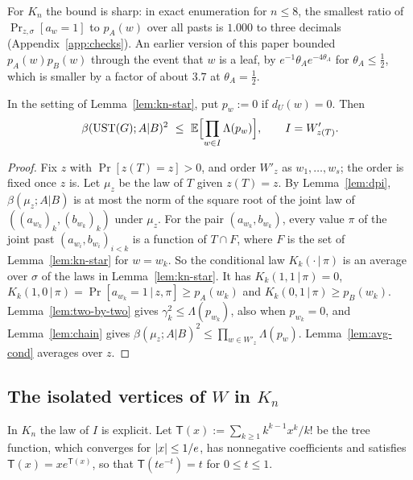 For $K_n$ the bound is sharp: in exact enumeration for $n\le8$, the smallest ratio of $\Pr_{z,\sigma}[a_w=1]$ to $p_A(w)$ over all pasts is $1.000$ to three decimals (Appendix~\ref{app:checks}). An earlier version of this paper bounded $p_A(w)p_B(w)$ through the event that $w$ is a leaf, by $e^{-1}\theta_Ae^{-4\theta_A}$ for $\theta_A\le\frac12$, which is smaller by a factor of about $3.7$ at $\theta_A=\frac12$.

\begin{lemma}\label{lem:kn-master}
In the setting of Lemma~\ref{lem:kn-star}, put $p_w:=0$ if $d_U(w)=0$. Then
\[
  \beta(\UST(G);A|B)^2\ \le\ \E\Bigl[\prod_{w\in I}\Lambda(p_w)\Bigr],\qquad I=W'_{z(T)} .
\]
\end{lemma}

\begin{proof}
Fix $z$ with $\Pr[z(T)=z]>0$, and order $W'_z$ as $w_1,\dots,w_s$; the order is fixed once $z$ is. Let $\mu_z$ be the law of $T$ given $z(T)=z$. By Lemma~\ref{lem:dpi}, $\beta(\mu_z;A|B)$ is at most the norm of the square root of the joint law of $((a_{w_k})_k,(b_{w_k})_k)$ under $\mu_z$. For the pair $(a_{w_k},b_{w_k})$, every value $\pi$ of the joint past $(a_{w_i},b_{w_i})_{i<k}$ is a function of $T\cap F$, where $F$ is the set of Lemma~\ref{lem:kn-star} for $w=w_k$. So the conditional law $K_k(\cdot\,|\,\pi)$ is an average over $\sigma$ of the laws in Lemma~\ref{lem:kn-star}. It has $K_k(1,1\,|\,\pi)=0$, $K_k(1,0\,|\,\pi)=\Pr[a_{w_k}=1\,|\,z,\pi]\ge p_A(w_k)$ and $K_k(0,1\,|\,\pi)\ge p_B(w_k)$. Lemma~\ref{lem:two-by-two} gives $\gamma_k^2\le\Lambda(p_{w_k})$, also when $p_{w_k}=0$, and Lemma~\ref{lem:chain} gives $\beta(\mu_z;A|B)^2\le\prod_{w\in W'_z}\Lambda(p_w)$. Lemma~\ref{lem:avg-cond} averages over $z$.
\end{proof}

\subsection{The isolated vertices of \texorpdfstring{$W$}{W} in \texorpdfstring{$K_n$}{K\_n}}

In $K_n$ the law of $I$ is explicit. Let $\mathsf T(x):=\sum_{k\ge1}k^{k-1}x^k/k!$ be the tree function, which converges for $\lvert x\rvert\le1/e$, has nonnegative coefficients and satisfies $\mathsf T(x)=xe^{\mathsf T(x)}$, so that $\mathsf T(te^{-t})=t$ for $0\le t\le1$.


